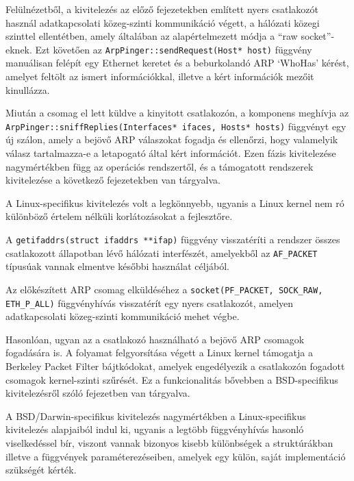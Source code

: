 	Felülnézetből, a kivitelezés az előző fejezetekben említett nyers csatlakozót használ adatkapcsolati közeg-szinti kommunikáció végett, a hálózati közegi szinttel ellentétben, amely általában az alapértelmezett módja a ``raw socket''-eknek. Ezt követően az \texttt{ArpPinger::sendRequest(Host* host)} függvény manuálisan felépít egy Ethernet keretet és a beburkolandó ARP `WhoHas' kérést, amelyet feltölt az ismert információkkal, illetve a kért információk mezőit kinullázza.
	
	Miután a csomag el lett küldve a kinyitott csatlakozón, a komponens meghívja az \texttt{ArpPinger::sniffReplies(Interfaces* ifaces, Hosts* hosts)} függvényt egy új szálon, amely a bejövő ARP válaszokat fogadja és ellenőrzi, hogy valamelyik válasz tartalmazza-e a letapogató által kért információt. Ezen fázis kivitelezése nagymértékben függ az operációs rendszertől, és a támogatott rendszerek kivitelezése a következő fejezetekben van tárgyalva.


	A Linux-specifikus kivitelezés volt a legkönnyebb, ugyanis a Linux kernel nem ró különböző értelem nélküli korlátozásokat a fejlesztőre.
	
	A \texttt{getifaddrs(struct ifaddrs **ifap)} függvény visszatéríti a rendszer összes csatlakozott állapotban lévő hálózati interfészét, amelyekből az \texttt{AF_PACKET} típusúak vannak elmentve későbbi használat céljából.

	Az előkészített ARP csomag elküldéséhez a \texttt{socket(PF_PACKET, SOCK_RAW, ETH_P_ALL)} függvényhívás visszatérít egy nyers csatlakozót, amelyen adatkapcsolati közeg-szinti kommunikáció mehet végbe.
	
	Hasonlóan, ugyan az a csatlakozó használható a bejövő ARP csomagok fogadására is. A folyamat felgyorsítása végett a Linux kernel támogatja a Berkeley Packet Filter bájtkódokat, amelyek engedélyezik a csatlakozón fogadott csomagok kernel-szinti szűrését. Ez a funkcionalitás bővebben a BSD-specifikus kivitelezésről szóló fejezetben van tárgyalva.


	A BSD/Darwin-specifikus kivitelezés nagymértékben a Linux-specifikus kivitelezés alapjaiból indul ki, ugyanis a legtöbb függvényhívás hasonló viselkedéssel bír, viszont vannak bizonyos kisebb különbségek a struktúrákban illetve a függvények paraméterezéseiben, amelyek egy külön, saját implementáció szükségét kérték.

